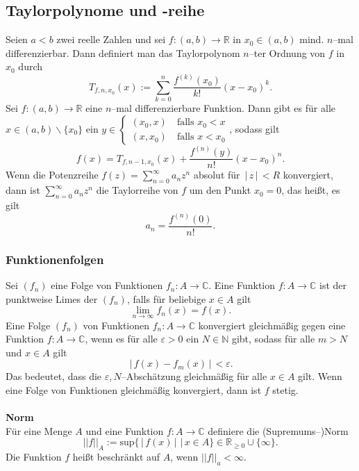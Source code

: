 \documentclass[a4paper,12pt]{article}
\begin{document}
\subsection{Taylorpolynome und -reihe}
Seien $a<b$ zwei reelle Zahlen und sei $f:\left(a,b\right)\rightarrow \mathbb{R}$ in $x_0 \in \left(a,b\right)$ mind. $n$--mal differenzierbar. Dann definiert man das Taylorpolynom $n$--ter Ordnung von $f$ in $x_0$ durch
\[ 
        T_{f,n,x_0}\left(x\right):=\sum_{k=0}^{n}\dfrac{f^{\left(k\right)}\left(x_0\right)}{k!}\left(x-x_0\right)^{k}
.\] 
Sei $f:\left(a,b\right)\rightarrow \mathbb{R}$ eine $n$--mal differenzierbare Funktion. Dann gibt es für alle $x \in \left(a,b\right)\backslash\{x_0\}$ ein $y \in \begin{cases} %
        \left(x_0,x\right)\quad \text{falls $x_0<x$}\\
        \left(x,x_0\right)\quad \text{falls $x<x_0$}
\end{cases}$, sodass gilt
\[ 
        f\left(x\right)=T_{f,n-1,x_0}\left(x\right)+\dfrac{f^{\left(n\right)}\left(y\right)}{n!}\left(x-x_0\right)^{n}
.\] 
Wenn die Potenzreihe $f\left(z\right)=\sum_{n=0}^{\infty}a_nz^n$ absolut für $\,|\, z\,|\, <R$ konvergiert, dann ist $\sum_{n=0}^{\infty}a_nz^n$ die Taylorreihe von $f$ um den Punkt $x_0=0$, das heißt, es gilt
\[ 
        a_n=\dfrac{f^{\left(n\right)}\left(0\right)}{n!}
.\] 

\subsubsection{Funktionenfolgen}
Sei $\left(f_n\right)$ eine Folge von Funktionen $f_n:A\rightarrow \mathbb{C}$. Eine Funktion $f:A\rightarrow \mathbb{C}$ ist der punktweise Limes der $\left(f_n\right)$, falls für beliebige $x \in A$ gilt
\[ 
        \lim_{n\rightarrow \infty}f_n\left(x\right)=f\left(x\right)
.\] 
Eine Folge $\left(f_n\right)$ von Funktionen $f_n:A\rightarrow \mathbb{C}$ konvergiert gleichmäßig gegen eine Funktion $f:A\rightarrow \mathbb{C}$, wenn es für alle $\varepsilon >0$ ein $N \in \mathbb{N}$ gibt, sodass für alle $m>N$ und $x \in A$ gilt
\[ 
        \,|\, f\left(x\right)-f_m\left(x\right)\,|\, <\varepsilon 
.\] 
Das bedeutet, dass die $\varepsilon ,N$--Abschätzung \glqq gleichmäßig\grqq{} für alle $x \in A$ gilt. Wenn eine Folge von Funktionen gleichmäßig konvergiert, dann ist $f$ stetig.
\\\hfill\\\textbf{Norm}\\ 
Für eine Menge $A$ und eine Funktion $f:A\rightarrow \mathbb{C}$ definiere die (Supremums--)Norm
\[ 
        ||f||_A:=\text{sup}\{\,|\, f\left(x\right)\,|\, \,|\, x \in A\} \in \mathbb{R}_{\geq 0}\cup \{\infty\}
.\] 
Die Funktion $f$ heißt beschränkt auf $A$, wenn $||f||_a<\infty$. 
\end{document}
